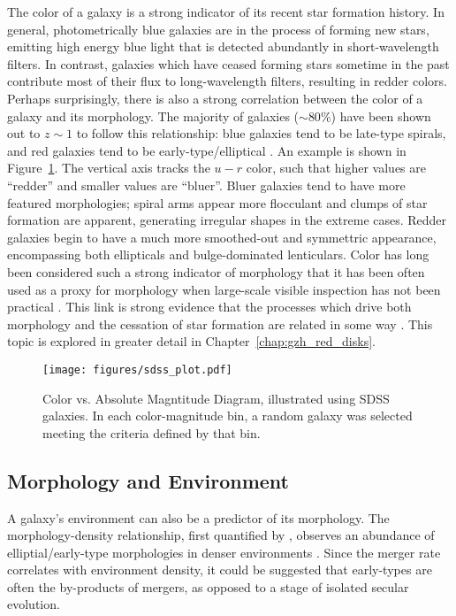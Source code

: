 The color of a galaxy is a strong indicator of its recent star formation history. In general, photometrically blue galaxies are in the process of forming new stars, emitting high energy blue light that is detected abundantly in short-wavelength filters. In contrast, galaxies which have ceased forming stars sometime in the past contribute most of their flux to long-wavelength filters, resulting in redder colors. Perhaps surprisingly, there is also a strong correlation between the color of a galaxy and its morphology. The majority of galaxies ($\sim80\%$) have been shown out to $z\sim1$ to follow this relationship: blue galaxies tend to be late-type spirals, and red galaxies tend to be early-type/elliptical \citep{Tully1982,Strateva2001,Baldry2004,Conselice2006,Martin2007,Mignoli2009}. An example is shown in Figure~\ref{fig:cmd}. The vertical axis tracks the $u-r$ color, such that higher values are ``redder'' and smaller values are ``bluer''. Bluer galaxies tend to have more featured morphologies; spiral arms appear more flocculant and clumps of star formation are apparent, generating irregular shapes in the extreme cases. Redder galaxies begin to have a much more smoothed-out and symmettric appearance, encompassing both ellipticals and bulge-dominated lenticulars. Color has long been considered such a strong indicator of morphology that it has been often used as a proxy for morphology when large-scale visible inspection has not been practical \citep{Cooray2005,Lee2007,Salimbeni2008,Simon2009}. This link is strong evidence that the processes which drive both morphology and the cessation of star formation are related in some way \citep{Masters2010,Buta2013}. This topic is explored in greater detail in Chapter~\ref{chap:gzh_red_disks}. 

\begin{figure}
\centering
\texttt{[image: figures/sdss\_plot.pdf]}
\label{fig:cmd}
\caption{Color vs. Absolute Magntitude Diagram, illustrated using SDSS galaxies. In each color-magnitude bin, a random galaxy was selected meeting the criteria defined by that bin.}
\end{figure}

\subsection{Morphology and Environment}

A galaxy's environment can also be a predictor of its morphology. The morphology-density relationship, first quantified by \citet{Dressler1980}, observes an abundance of elliptial/early-type morphologies in denser environments \citep{deSouza1982,Postman1984}. Since the merger rate correlates with environment density, it could be suggested that early-types are often the by-products of mergers, as opposed to a stage of isolated secular evolution. 

